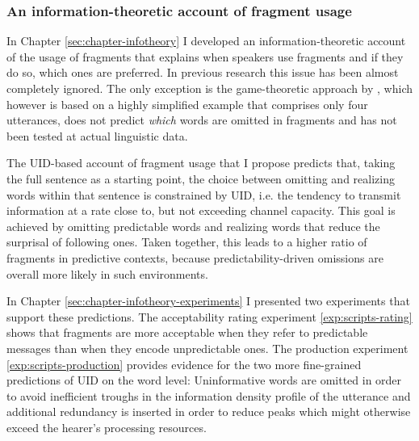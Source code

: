 \subsubsection{An information-theoretic account of fragment usage}

In Chapter \ref{sec:chapter-infotheory} I developed an information-theoretic account of the usage of fragments that explains when speakers use fragments and if they do so, which ones are preferred. In previous research this issue has been almost completely ignored. The only exception is the game-theoretic approach by \citet{bergen.goodman2015}, which however is based on a highly simplified example that comprises only four utterances, does not predict \textit{which} words are omitted in fragments and has not been tested at actual linguistic data. 

The UID-based account of fragment usage that I propose predicts that, taking the full sentence as a starting point, the choice between omitting and realizing words within that sentence is constrained by UID, i.e. the tendency to transmit information at a rate close to, but not exceeding channel capacity. This goal is achieved by omitting predictable words and realizing words that reduce the surprisal of following ones. Taken together, this leads to a higher ratio of fragments in predictive contexts, because predictability-driven omissions are overall more likely in such environments. 

In Chapter \ref{sec:chapter-infotheory-experiments} I presented two experiments that support these predictions. The acceptability rating experiment \ref{exp:scripts-rating} shows that fragments are more acceptable when they refer to predictable messages than when they encode unpredictable ones. The production experiment \ref{exp:scripts-production} provides evidence for the two more fine-grained predictions of UID on the word level: Uninformative words are omitted in order to avoid inefficient troughs in the information density profile of the utterance and additional redundancy is inserted in order to reduce peaks which might otherwise exceed the hearer's processing resources.

